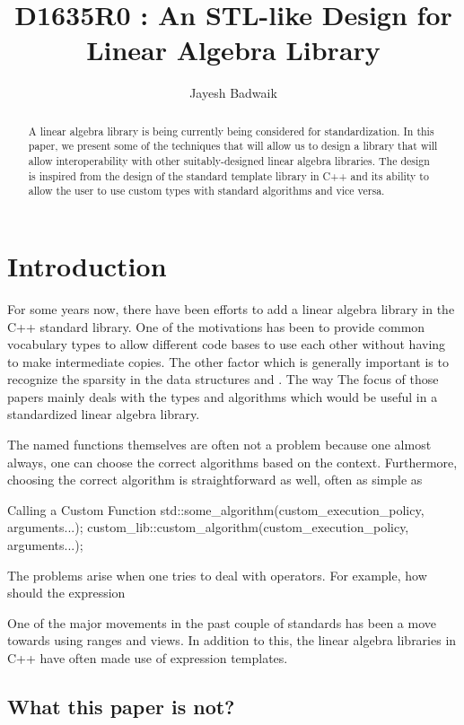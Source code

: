 \documentclass[oneside,11pt,a4paper]{jbarticle}
\subtitle{}
\title{D1635R0 : An STL-like Design for Linear Algebra Library}
\author{Jayesh Badwaik}
\begin{document}
\maketitle[\value{page}]
\begin{abstract}
  A linear algebra library is being currently being considered for
  standardization.  In this paper, we present some of the techniques that will
  allow us to design a library that will allow interoperability with other
  suitably-designed linear algebra libraries. The design is inspired from the
  design of the standard template library in C++ and its ability to allow the
  user to use custom types with standard algorithms and vice versa.
\end{abstract}

\section{Introduction}
For some years now, there have been efforts to add a linear algebra library in
the C++ standard library.  One of the motivations has been to provide
common vocabulary types to allow different code bases to use each other without
having to make intermediate copies. The other factor which is generally
important is to recognize the sparsity in the data structures and . The way
The focus of those papers mainly
deals with the types and algorithms which would be useful in a standardized
linear algebra library.


The named functions themselves are often not a problem because one almost
always, one can choose the correct algorithms based on the context. Furthermore,
choosing the correct algorithm is straightforward as well, often as simple as
\begin{codecpp}{Calling a Custom Function}
  std::some_algorithm(custom_execution_policy, arguments...);
  custom_lib::custom_algorithm(custom_execution_policy, arguments...);
\end{codecpp}

The problems arise when one tries to deal with operators. For example, how
should the expression 

One of the major movements in the past couple of standards has been a move
towards using ranges and views. In addition to this, the linear algebra
libraries in C++ have often made use of expression templates.

\subsection{What this paper is not?}
\end{document}
